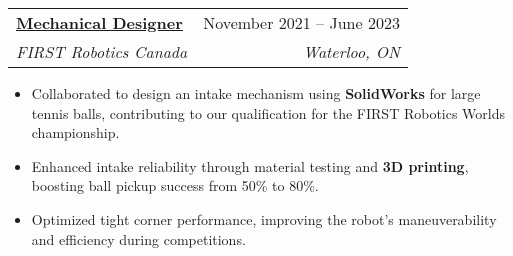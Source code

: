 \documentclass[letterpaper]{article}
\makeatletter
\newcommand{\resumeItem}[1]{
  \item\small{
    {#1 \vspace{-2pt}}
  }
}
\newcommand{\resumeSubheading}[4]{
  \vspace{-2pt}\item
    \begin{tabular*}{0.97\textwidth}[t]{l@{\extracolsep{\fill}}r}
      \textbf{#1} & #2 \\
      \textit{\small#3} & \textit{\small #4} \\
    \end{tabular*}\vspace{-7pt}
}
\newcommand{\resumeItemListStart}{\begin{itemize}}
\newcommand{\resumeItemListEnd}{\end{itemize}\vspace{-5pt}}
\makeatother
\begin{document}
\resumeSubheading
{\href{https://www.gavintranquilino.com/rapid-react.html}{\underline{Mechanical Designer}}}{November 2021 -- June 2023}
{FIRST Robotics Canada}{Waterloo, ON}
\resumeItemListStart
\resumeItem{Collaborated to design an intake mechanism using \textbf{SolidWorks} for large tennis balls, contributing to our qualification for the FIRST Robotics Worlds championship.}
\resumeItem{Enhanced intake reliability through material testing and \textbf{3D printing}, boosting ball pickup success from 50\% to 80\%.}
\resumeItem{Optimized tight corner performance, improving the robot's maneuverability and efficiency during competitions.}
\resumeItemListEnd


\end{document}
